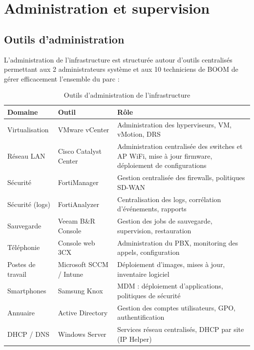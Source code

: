\documentclass[12pt,a4paper]{report}
\begin{document}
\chapter{Administration et supervision}

\section{Outils d'administration}

L'administration de l'infrastructure est structurée autour d'outils centralisés permettant aux 2 administrateurs système et aux 10 techniciens de BOOM de gérer efficacement l'ensemble du parc :

\begin{table}[H]
\centering
\small
\begin{tabularx}{\textwidth}{L{3cm}L{3cm}L{7cm}}
\toprule
\textbf{Domaine} & \textbf{Outil} & \textbf{Rôle} \\
\midrule
Virtualisation & VMware vCenter & Administration des hyperviseurs, VM, vMotion, DRS \\
Réseau LAN & Cisco Catalyst Center & Administration centralisée des switches et AP WiFi, mise à jour firmware, déploiement de configurations \\
Sécurité & FortiManager & Gestion centralisée des firewalls, politiques SD-WAN \\
Sécurité (logs) & FortiAnalyzer & Centralisation des logs, corrélation d'événements, rapports \\
Sauvegarde & Veeam B\&R Console & Gestion des jobs de sauvegarde, supervision, restauration \\
Téléphonie & Console web 3CX & Administration du PBX, monitoring des appels, configuration \\
Postes de travail & Microsoft SCCM / Intune & Déploiement d'images, mises à jour, inventaire logiciel \\
Smartphones & Samsung Knox & MDM : déploiement d'applications, politiques de sécurité \\
Annuaire & Active Directory & Gestion des comptes utilisateurs, GPO, authentification \\
DHCP / DNS & Windows Server & Services réseau centralisés, DHCP par site (IP Helper) \\
\bottomrule
\end{tabularx}
\caption{Outils d'administration de l'infrastructure}
\label{tab:outils_admin}
\end{table}
\end{document}
